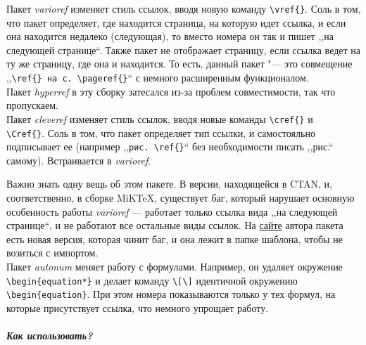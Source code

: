 Пакет \emph{varioref} изменяет стиль ссылок, вводя новую команду \verb|\vref{}|.\cite{varioref} Соль в том, что пакет определяет, где находится страница, на которую идет ссылка, и если она находится недалеко (следующая), то вместо номера он так и пишет ,,на следующей странице``. Также пакет не отображает страницу, если ссылка ведет на ту же страницу, где она и находится. То есть, данный пакет "--- это совмещение ,,\verb|\ref{} на с. \pageref{}|`` с немного расширенным функционалом. ~\\

Пакет \emph{hyperref} в эту сборку затесался из-за проблем совместимости, так что пропускаем.\cite{hyperref} ~\\

Пакет \emph{cleveref} изменяет стиль ссылок, вводя новые команды \verb|\сref{}| и \\ \verb|\Cref{}|.\cite{cleveref} Соль в том, что пакет определяет тип ссылки, и самостояльно подписывает ее (например ,,\verb|рис. \ref{}|`` без необходимости писать ,,рис.`` самому). Встраивается в \emph{varioref}.

Важно знать одну вещь об этом пакете. В версии, находящейся в CTAN, и, соответственно, в сборке MiKTeX, существует баг, который нарушает основную особенность работы \emph{varioref} --- работает только ссылка вида ,,на следующей странице``, и не работают все остальные виды ссылок. На \href{http://www.dr-qubit.org/latex.php#cleveref-docs}{сайте} автора пакета есть новая версия, которая чинит баг, и она лежит в папке шаблона, чтобы не возиться с импортом.~\\

Пакет \emph{autonum} меняет работу с формулами.\cite{autonum} Например, он удаляет окружение \verb|\begin{equation*}| и делает команду \verb|\[\]| идентичной окружению \\ \verb|\begin{equation}|. При этом номера показываются только у тех формул, на которые присутствует ссылка, что немного упрощает работу.

\subparagraph{Как использовать?}

